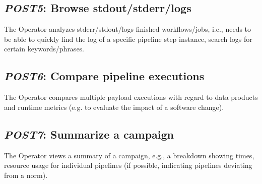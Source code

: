 \documentclass[DM,lsstdraft,toc]{lsstdoc}
\newcommand{\usecase}[2]{\subsection{\emph{#1}: #2}\label{use:#1}}
\begin{document}
\usecase{POST5}{Browse stdout/stderr/logs}
The Operator analyzes stderr/stdout/logs finished workflows/jobs,
i.e., needs to be able to quickly find the log of a specific pipeline step
instance, search logs for certain keywords/phrases.

\usecase{POST6}{Compare pipeline executions}
The Operator compares multiple payload executions with regard to data
products and runtime metrics (e.g. to evaluate the impact of a
software change).

\usecase{POST7}{Summarize a campaign}
The Operator views a summary of a campaign, e.g., a breakdown showing
times, resource usage for individual pipelines (if possible, indicating
pipelines deviating from a norm).

%
\end{document}
